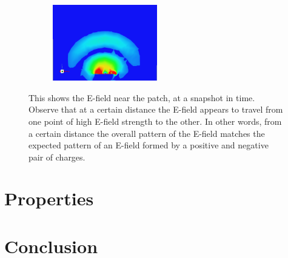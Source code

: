 \documentclass[12pt]{article}
\begin{document}
\begin{figure}[h]
\begin{subfigure}{0.5\textwidth}
    \end{subfigure}
    \begin{subfigure}{0.5\textwidth}
    \centering
    	\includegraphics[width=0.5\textwidth]{basic-patch-antenna-radiating-t4.png}
    \end{subfigure}
    \caption{This shows the E-field near the patch, at a snapshot in time. Observe that at a certain distance the E-field appears to travel from one point of high E-field strength to the other. In other words, from a certain distance the overall pattern of the E-field matches the expected pattern of an E-field formed by a positive and negative pair of charges.}
\end{figure}  

\section{Properties}

\section{Conclusion}

\newpage


\end{document}
